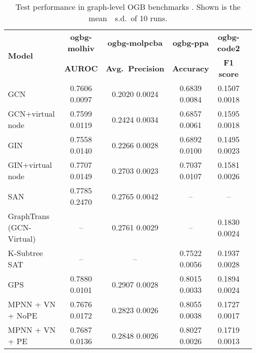 \documentclass[nohyperref]{article}
\theoremstyle{plain}
\theoremstyle{definition}
\theoremstyle{remark}
\newcommand{\tabtopvspace}{{\vspace{-0pt}}}
\newcommand{\method}{GPS\xspace}
\begin{document}
\begin{table*}[t]
    \caption{Test performance in graph-level OGB benchmarks \citep{hu2020open}. Shown is the mean~~s.d.~of 10 runs. }
    \label{tab:results_ogb}
    \tabtopvspace
    \centering
\fontsize{8.5pt}{8.5pt}\selectfont
    \begin{tabular}{lccccc}\toprule
    \multirow{2}{*}{\textbf{Model}} &\textbf{ogbg-molhiv} &\textbf{ogbg-molpcba} &\textbf{ogbg-ppa} &\textbf{ogbg-code2} \\\cmidrule{2-5}
                               & \textbf{AUROC }    & \textbf{Avg.~Precision } & \textbf{Accuracy } & \textbf{F1 score } \\\midrule
    GCN                        & 0.7606  0.0097          & 0.2020  0.0024          & 0.6839  0.0084          & 0.1507  0.0018 \\
    GCN+virtual node           & 0.7599  0.0119          & 0.2424  0.0034          & 0.6857  0.0061          & 0.1595  0.0018 \\
    GIN                        & 0.7558  0.0140          & 0.2266  0.0028          & 0.6892  0.0100          & 0.1495  0.0023 \\
    GIN+virtual node           & 0.7707  0.0149          & 0.2703  0.0023          & 0.7037  0.0107          & 0.1581  0.0026 \\
    \midrule
SAN                        & 0.7785  0.2470          & 0.2765  0.0042          & --                           & -- \\
GraphTrans (GCN-Virtual)   & --                           & 0.2761  0.0029          & --                           & 0.1830  0.0024 \\
    K-Subtree SAT              & --                           & --                           & 0.7522  0.0056          & 0.1937  0.0028 \\\method                    & 0.7880  0.0101          & 0.2907  0.0028          & 0.8015  0.0033          & 0.1894  0.0024 \\ \midrule
    MPNN + VN + NoPE           & 0.7676  0.0172          & 0.2823  0.0026          & 0.8055  0.0038          & 0.1727  0.0017             & \\
    MPNN + VN + PE             & 0.7687  0.0136          & 0.2848  0.0026          & 0.8027  0.0026          & 0.1719  0.0013             & \\
    \bottomrule
    \end{tabular}
\end{table*}
\end{document}
